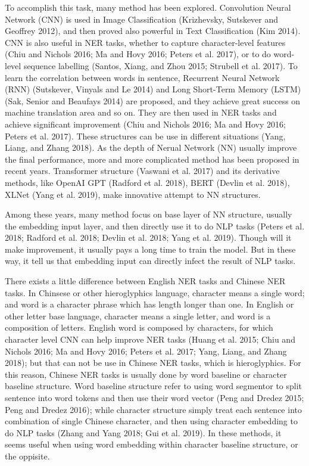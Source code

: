 \documentclass[letterpaper]{article} %
\begin{document}
To accomplish this task, many method has been explored.  Convolution Neural Network (CNN) is used in Image Classification (Krizhevsky, Sutskever and Geoffrey 2012), and then proved also powerful in Text Classification (Kim 2014). CNN is also useful in NER tasks, whether to capture character-level features (Chiu and Nichols 2016; Ma and Hovy 2016; Peters et al. 2017), or to do word-level sequence labelling (Santos, Xiang, and Zhou 2015; Strubell et al. 2017). To learn the correlation between words in sentence, Recurrent Neural Network (RNN) (Sutskever, Vinyals and Le 2014) and Long Short-Term Memory (LSTM)  (Sak, Senior and Beaufays 2014) are proposed, and they achieve great success on machine translation area and so on. They are then used in NER tasks and achieve significant improvement (Chiu and Nichols 2016; Ma and Hovy 2016; Peters et al. 2017). These structures can be use in different situations (Yang, Liang, and Zhang 2018). As the depth of Nerual Network (NN) usually improve the final performance, more and more complicated method has been proposed in recent years. Transformer structure (Vaswani et al. 2017) and its derivative methods, like OpenAI GPT (Radford et al. 2018), BERT (Devlin et al. 2018), XLNet (Yang et al. 2019), make innovative attempt to NN structures. 

Among these years, many method focus on base layer of NN structure, usually the embedding input layer, and then directly use it to do NLP tasks (Peters et al. 2018; Radford et al. 2018; Devlin et al. 2018; Yang et al. 2019). Though will it make improvement, it usually pays a long time to train the model. But in these way, it tell us that embedding input can directly infect the result of NLP tasks. 

There exists a little difference between English NER tasks and Chinese NER tasks. In Chinsese or other hieroglyphics language, character means a single word; and word is a character phrase which has length longer than one. In English or other letter base language, character means a single letter, and word is a composition of letters. English word is composed by characters, for which character level CNN can help improve NER tasks (Huang et al. 2015; Chiu and Nichols 2016; Ma and Hovy 2016; Peters et al. 2017; Yang, Liang, and Zhang 2018); but that can not be use in Chinese NER tasks, which is hieroglyphics. For this reason, Chinese NER tasks is usually done by word baseline or character baseline structure. Word baseline structure refer to using word segmentor to split sentence into word tokens and then use their word vector (Peng and Dredez 2015; Peng and Dredez 2016); while character structure simply treat each sentence into combination of single Chinese character, and then using character embedding to do NLP tasks (Zhang and Yang 2018; Gui et al. 2019). In these methods, it seems useful when using word embedding within character baseline structure, or the oppisite. 
\end{document}
